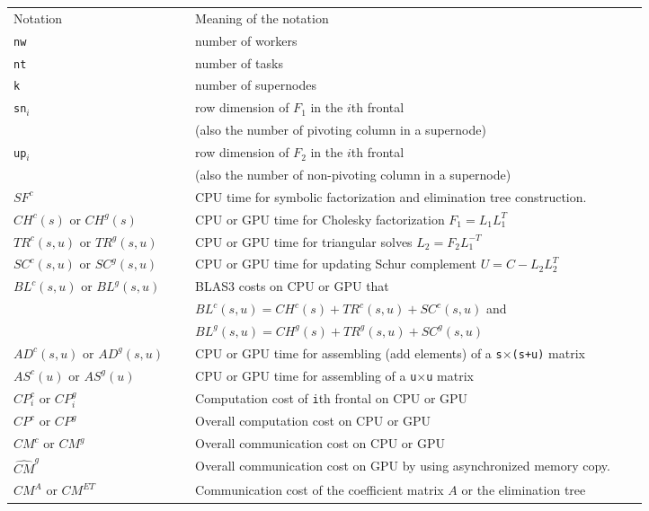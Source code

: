 \documentclass[preprint,11pt]{elsarticle}
\begin{document}
\begin{table}
  \centering
  {\footnotesize 
  \begin{tabular}{lllll}
    \hline
    Notation    &\ & Meaning of the notation \\  \cline{1-1}  \cline{3-3}
    {\tt nw}        && number of workers \\
    {\tt nt}          && number of tasks \\
    {\tt k}           && number of supernodes \\
    {\tt sn$_i$}  && row dimension of $F_1$ in the $i$th frontal \\
                       && (also the number of pivoting column in a supernode) \\
    {\tt up$_i$}  && row dimension of $F_2$ in the $i$th frontal \\
                       && (also the number of non-pivoting column in a supernode) \\ 
    \hline
    $SF^c$  && CPU time for symbolic factorization and elimination tree construction.\\
    $CH^c(s)$ or $CH^g(s)$     && CPU or GPU time for Cholesky factorization $F_1=L_1L_1^{T}$ \\
    $TR^c(s,u)$ or $TR^g(s,u)$ && CPU or GPU time for triangular solves $L_2 = F_2L_1^{-T}$\\
    $SC^c(s, u)$ or $SC^g(s, u)$     && CPU or GPU time for updating Schur complement $U = C - L_2L_2^{T}$ \\
    $BL^c(s,u)$ or $BL^g(s,u)$ && BLAS3 costs on CPU or GPU that\\
    && $BL^c(s,u) = CH^c(s) + TR^c(s, u) +SC^c(s, u)$ and\\
    && $BL^g(s,u) = CH^g(s) + TR^g(s, u) +SC^g(s, u)$\\\hline

    $AD^c(s, u)$ or $AD^g(s, u)$   && CPU or GPU time for assembling (add elements) of a {\tt s}$\times${\tt (s+u)} matrix \\
    $AS^c(u)$ or $AS^g(u)$   && CPU or GPU time for assembling of a {\tt u}$\times${\tt u} matrix \\ \hline

    $CP^c_i$ or $CP^g_i$ && Computation cost of {\tt i}th frontal on CPU or GPU\\
    $CP^c$ or $CP^g$ && Overall computation cost on CPU or GPU\\ \hline

    $CM^c$ or $CM^{g}$ && Overall communication cost  on CPU or GPU\\
    $ \widehat{CM}^{g}$ && Overall communication cost  on GPU by using asynchronized memory copy. \\
    $CM^A$ or $CM^{ET}$ && Communication cost of the coefficient matrix $A$ or
the elimination tree\\


\end{tabular}}
\end{table}
\end{document}
